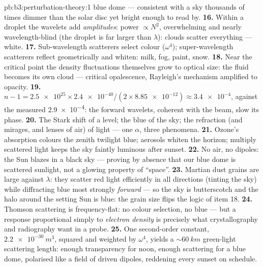 \begin{solution}{pb:b3:perturbation-theory:1}
blue dome --- consistent with a sky thousands of times dimmer
than the solar disc yet bright enough to read by.
\textbf{16.} Within a droplet the wavelets add \emph{amplitudes}:
power $\propto N^2$, overwhelming and nearly wavelength-blind
(the droplet is far larger than $\lambda$): clouds scatter
everything --- white.
\textbf{17.} Sub-wavelength scatterers select colour
($\omega^4$); super-wavelength scatterers reflect geometrically
and whiten: milk, fog, paint, snow.
\textbf{18.} Near the critical point the density fluctuations
themselves grow to optical size: the fluid becomes its own cloud
--- critical opalescence, Rayleigh's mechanism amplified to
opacity.
\textbf{19.} $n - 1 = \num{2.5e25} \times \num{2.4e-40}/(2 \times
\num{8.85e-12}) \approx \num{3.4e-4}$, against the measured
\num{2.9e-4}: the forward wavelets, coherent with the beam, slow
its phase.
\textbf{20.} The Stark shift of a level; the blue of the sky; the
refraction (and mirages, and lenses of air) of light --- one
$\alpha$, three phenomena.
\textbf{21.} Ozone's absorption colours the zenith twilight blue;
aerosols whiten the horizon; multiply scattered light keeps the
sky faintly luminous after sunset.
\textbf{22.} No air, no dipoles: the Sun blazes in a black sky
--- proving by absence that our blue dome is scattered sunlight,
not a glowing property of ``space''.
\textbf{23.} Martian dust grains are large against $\lambda$:
they scatter red light efficiently in all directions (tinting the
sky) while diffracting blue most strongly \emph{forward} --- so
the sky is butterscotch and the halo around the setting Sun is
blue: the grain size flips the logic of item 18.
\textbf{24.} Thomson scattering is frequency-flat: no colour
selection, no blue --- but a response proportional simply to
\emph{electron density} is precisely what crystallography and
radiography want in a probe.
\textbf{25.} One second-order constant, $\qty{2.2e-30}{m^3}$,
squared and weighted by $\omega^4$, yields a $\sim\qty{60}{km}$
green-light scattering length: enough transparency for noon,
enough scattering for a blue dome, polarised like a field of
driven dipoles, reddening every sunset on schedule.
\end{solution}
